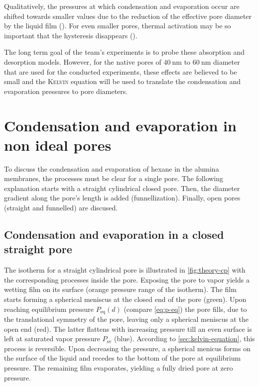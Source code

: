 \documentclass[../thesis.tex]{subfiles}
\begin{document}
      Qualitatively, the pressures at which condensation and evaporation occur are shifted towards smaller values due to the reduction of the effective pore diameter by the liquid film (\cite{Saam1975a}). For even smaller pores, thermal activation may be so important that the hysteresis disappears (\cite{etienne}).
      \medskip

      The long term goal of the team's experiments is to probe these absorption and desorption models. However, for the native pores of $\SI{40}{\nano\meter}$ to $\SI{60}{\nano\meter}$ diameter that are used for the conducted experiments, these effects are believed to be small and the \textsc{Kelvin} equation will be used to translate the condensation and evaporation pressures to pore diameters.


    \section{Condensation and evaporation in non ideal pores}
    \label{eq:cond-evap-non-ideal-pore}

      To discuss the condensation and evaporation of hexane in the alumina membranes, the processes must be clear for a single pore. The following explanation starts with a straight cylindrical closed pore. Then, the diameter gradient along the pore's length is added (funnellization). Finally, open pores (straight and funnelled) are discused.

      \subsection{Condensation and evaporation in a closed straight pore}
      \label{subsec:closed-pore-theory}

        The isotherm for a straight cylindrical pore is illustrated in \cref{fig:theory-cp} with the corresponding processes inside the pore. Exposing the pore to vapor yields a wetting film on its surface (orange pressure range of the isotherm). The film starts forming a spherical meniscus at the closed end of the pore (green). Upon reaching equilibrium pressure $P_\mathrm{eq}(d)$ (compare \cref{eq:p-eq}) the pore fills, due to the translational symmetry of the pore, leaving only a spherical meniscus at the open end (red). The latter flattens with increasing pressure till an even surface is left at saturated vapor pressure $P_\mathrm{sv}$ (blue). According to \cref{sec:kelvin-equation}, this process is reversible. Upon decreasing the pressure, a spherical menicus forms on the surface of the liquid and recedes to the bottom of the pore at equilibrium pressure. The remaining film evaporates, yielding a fully dried pore at zero pressure.
\end{document}
